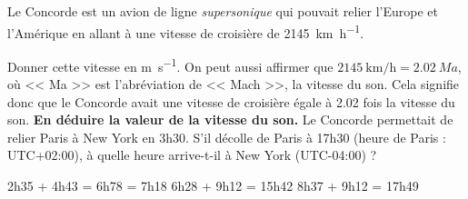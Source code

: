 \documentclass[../Cours.tex]{subfiles}
\begin{document}
\begin{questions}
    \exercice Le Concorde est un avion de ligne \emph{supersonique} qui pouvait relier l'Europe et l'Amérique en allant à une vitesse de croisière de \qty{2145}{\kilo\metre\per\hour}.

    \question Donner cette vitesse en \unit{\metre\per\second}.
    \question On peut aussi affirmer que $\qty{2145}{\kilo\metre\per\hour} = \qty{2.02}{Ma}$, où << Ma >> est l'abréviation de << Mach >>, la vitesse du son. Cela signifie donc que le Concorde avait une vitesse de croisière égale à \num{2.02} fois la vitesse du son. \textbf{En déduire la valeur de la vitesse du son.}
    \question Le Concorde permettait de relier Paris à New York en 3h30. S'il décolle de Paris à 17h30 (heure de Paris : UTC+02:00), à quelle heure arrive-t-il à New York (UTC-04:00) ?
\end{questions}

\clearpage
\CORRECTIONS
\begin{questions}
    \exercice
    \question 2h35 + 4h43 = 6h78 = 7h18
    \question 6h28 + 9h12 = 15h42
    \question 8h37 + 9h12 = 17h49    
\end{questions}
\end{document}
